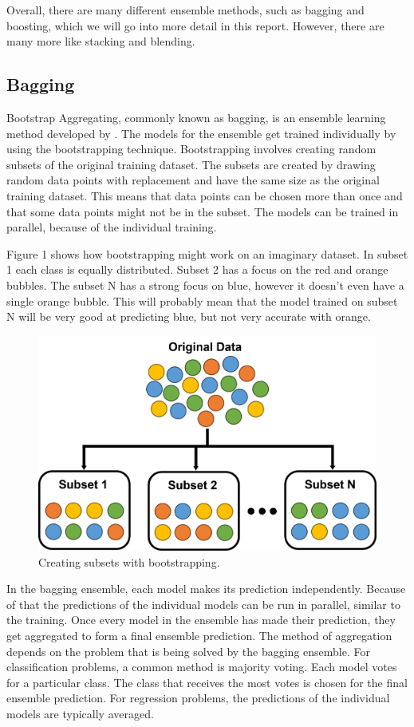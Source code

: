 Overall, there are many different ensemble methods, such as bagging and boosting, 
which we will go into more detail in this report. However, there are many more 
like stacking and blending.

\subsection{Bagging}

Bootstrap Aggregating, commonly known as bagging, is an ensemble learning method
developed by \citet*{Breiman1996}. The models for the ensemble get trained individually
by using the bootstrapping technique. Bootstrapping involves creating random
subsets of the original training dataset. The subsets are created by drawing 
random data points with replacement and have the same size as the original
training dataset. This means that data points can be chosen more than once and
that some data points might not be in the subset. The models can be trained in
parallel, because of the individual training.


Figure 1 shows how bootstrapping might work on an imaginary dataset. In subset 1
each class is equally distributed. Subset 2 has a focus on the red and orange bubbles.
The subset N has a strong focus on blue, however it doesn't even have a single 
orange bubble. This will probably mean that the model trained on subset N will be very
good at predicting blue, but not very accurate with orange.

\begin{figure}[htbp]
    \centering
    \includegraphics[width=.5\textwidth]{figures/bootstrapping}
    \caption{Creating subsets with bootstrapping.}
\end{figure}

In the bagging ensemble, each model makes its prediction independently. Because of
that the predictions of the individual models can be run in parallel, similar to
the training. Once every model in the ensemble has made their prediction, they get
aggregated to form a final ensemble prediction. The method of aggregation depends
on the problem that is being solved by the bagging ensemble. 
For classification problems, a common method is majority voting. Each model votes 
for a particular class. The class that receives the most votes is chosen for the
final ensemble prediction.
For regression problems, the predictions of the individual models are typically 
averaged.

